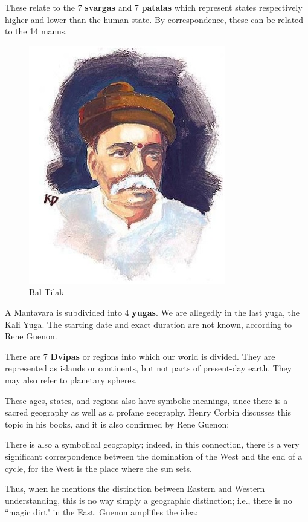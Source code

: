 These relate to the 7 \textbf{svargas} and 7 \textbf{patalas} which represent states respectively higher and lower than the human state. By correspondence, these can be related to the 14 manus.

\begin{figure}
 \includegraphics[scale=.5]{a20200723ArcticHomeintheVedas-img001.jpg} 
 \caption{Bal Tilak}
\end{figure} 

A Mantavara is subdivided into 4 \textbf{yugas}. We are allegedly in the last yuga, the Kali Yuga. The starting date and exact duration are not known, according to Rene Guenon.

There are 7 \textbf{Dvipas} or regions into which our world is divided. They are represented as islands or continents, but not parts of present-day earth. They may also refer to planetary spheres.

These ages, states, and regions also have symbolic meanings, since there is a sacred geography as well as a profane geography. Henry Corbin discusses this topic in his books, and it is also confirmed by Rene Guenon:

\begin{quotex}
There is also a symbolical geography; indeed, in this connection, there is a very significant correspondence between the domination of the West and the end of a cycle, for the West is the place where the sun sets. 

\end{quotex}
Thus, when he mentions the distinction between Eastern and Western understanding, this is no way simply a geographic distinction; i.e., there is no ``magic dirt" in the East. Guenon amplifies the idea:

